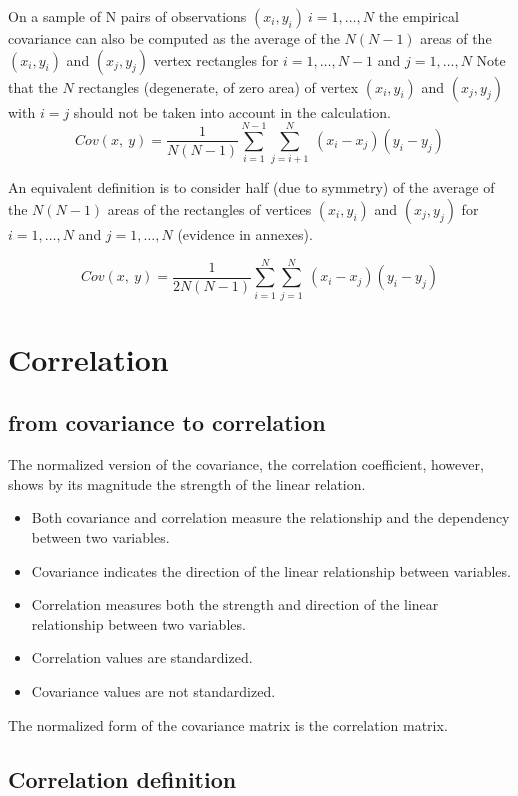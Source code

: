 \documentclass[
]{report}
\providecommand{\tightlist}{%
  \setlength{\itemsep}{0pt}\setlength{\parskip}{0pt}}
\begin{document}
On a sample of N pairs of observations \((x_i,y_i)~i=1,\dots, N\) the empirical covariance can also be computed as the average of the \(N(N-1)\) areas of the \((x_i,y_i)\) and \((x_j,y_j)\) vertex rectangles for \(i=1,\dots, N-1\) and \(j=1,\dots, N\)
Note that the \(N\) rectangles (degenerate, of zero area) of vertex \((x_i,y_i)\) and \((x_j,y_j)\) with \(i=j\) should not be taken into account in the calculation.
\[Cov(x,~y)=\frac{1}{N(N-1)}\sum_{i=1}^{N-1} \sum_{j=i+1}^{N}~(x_i-x_j)(y_i-y_j)\]

An equivalent definition is to consider half (due to symmetry) of the average of the \(N(N-1)\) areas of the rectangles of vertices \((x_i,y_i)\) and \((x_j,y_j)\) for \(i=1,\dots, N\) and \(j=1,\dots, N\) (evidence in annexes).

\[Cov(x,~y)=\frac{1}{2N(N-1)}
\sum_{i=1}^{N} \sum_{j=1}^{N}~(x_i-x_j)(y_i-y_j)\]

\hypertarget{correlation}{%
\chapter{Correlation}\label{correlation}}

\hypertarget{from-covariance-to-correlation}{%
\section{from covariance to correlation}\label{from-covariance-to-correlation}}

The normalized version of the covariance, the correlation coefficient, however, shows by its magnitude the strength of the linear relation.

\begin{itemize}
\tightlist
\item
  Both covariance and correlation measure the relationship and the dependency between two variables.
\item
  Covariance indicates the direction of the linear relationship between variables.
\item
  Correlation measures both the strength and direction of the linear relationship between two variables.
\item
  Correlation values are standardized.
\item
  Covariance values are not standardized.
\end{itemize}

The normalized form of the covariance matrix is the correlation matrix.

\hypertarget{correlation-definition}{%
\section{Correlation definition}\label{correlation-definition}}
\end{document}
